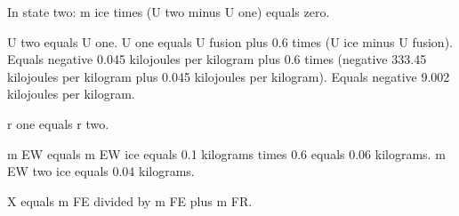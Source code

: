 In state two:  
m ice times (U two minus U one) equals zero.  

U two equals U one.  
U one equals U fusion plus 0.6 times (U ice minus U fusion).  
Equals negative 0.045 kilojoules per kilogram plus 0.6 times (negative 333.45 kilojoules per kilogram plus 0.045 kilojoules per kilogram).  
Equals negative 9.002 kilojoules per kilogram.  

r one equals r two.  

m EW equals m EW ice equals 0.1 kilograms times 0.6 equals 0.06 kilograms.  
m EW two ice equals 0.04 kilograms.  

X equals m FE divided by m FE plus m FR.